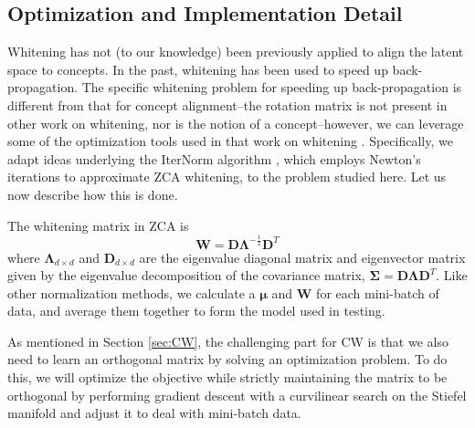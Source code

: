 \documentclass{article}
\begin{document}
\subsection{Optimization and Implementation Detail} \label{sec:detail}
Whitening has not (to our knowledge) been previously applied to align the latent space to concepts. In the past, whitening has been used to speed up back-propagation. The specific whitening problem for speeding up back-propagation is different from that for concept alignment--the rotation matrix is not present in other work on whitening, nor is the notion of a concept--however, we can leverage some of the optimization tools used in that work on whitening \cite{huang2019iterative,huang2018orthogonal,siarohin2018whitening}. Specifically, we adapt ideas underlying the IterNorm algorithm \cite{huang2019iterative}, which employs Newton's iterations to approximate ZCA whitening, to the problem studied here. Let us now describe how this is done.

The whitening matrix in ZCA is
\begin{equation}
    \mathbf{W} = \mathbf{D}\mathbf{\Lambda}^{-\frac{1}{2}}\mathbf{D}^T
\end{equation}
where $\mathbf{\Lambda}_{d \times d}$ and $\mathbf{D}_{d \times d}$ are the eigenvalue diagonal matrix and eigenvector matrix given by the eigenvalue decomposition of the covariance matrix,  $\mathbf{\Sigma}=\mathbf{D}\mathbf{\Lambda}\mathbf{D}^T$. Like other normalization methods, we calculate a $\mathbf{\mu}$ and $\mathbf{W}$ for each mini-batch of data, and average them together to form the model used in testing.

As mentioned in Section \ref{sec:CW}, the challenging part for CW is that we also need to learn an orthogonal matrix by solving an optimization problem. To do this, we will optimize the objective while strictly maintaining the matrix to be orthogonal by performing gradient descent with a curvilinear search on the Stiefel manifold \cite{wen2013feasible} and adjust it to deal with mini-batch data.
\end{document}
